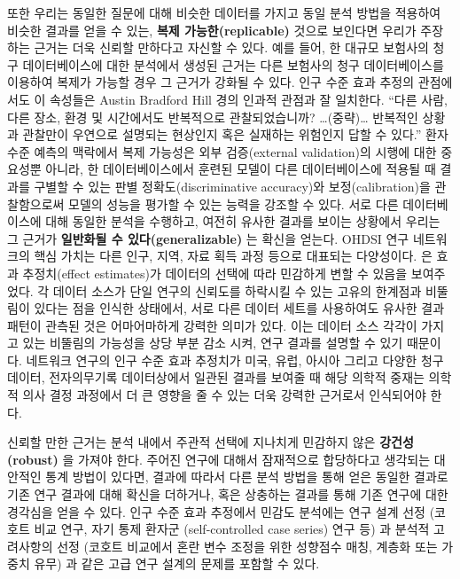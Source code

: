 \documentclass[10.5pt]{book}
\theoremstyle{definition}
\theoremstyle{definition}
\theoremstyle{definition}
\theoremstyle{remark}
\begin{document}
또한 우리는 동일한 질문에 대해 비슷한 데이터를 가지고 동일 분석 방법을
적용하여 비슷한 결과를 얻을 수 있는, \textbf{복제 가능한(replicable)}
것으로 보인다면 우리가 주장하는 근거는 더욱 신뢰할 만하다고 자신할 수
있다. 예를 들어, 한 대규모 보험사의 청구 데이터베이스에 대한 분석에서
생성된 근거는 다른 보험사의 청구 데이터베이스를 이용하여 복제가 가능할
경우 그 근거가 강화될 수 있다. 인구 수준 효과 추정의 관점에서도 이
속성들은 Austin Bradford Hill 경의 인과적 관점과 잘 일치한다. ``다른
사람, 다른 장소, 환경 및 시간에서도 반복적으로 관찰되었습니까?
\ldots{}(중략)\ldots{} 반복적인 상황과 관찰만이 우연으로 설명되는
현상인지 혹은 실재하는 위험인지 답할 수 있다.'' \citep{hill_1965} 환자
수준 예측의 맥락에서 복제 가능성은 외부 검증(external validation)의
시행에 대한 중요성뿐 아니라, 한 데이터베이스에서 훈련된 모델이 다른
데이터베이스에 적용될 때 결과를 구별할 수 있는 판별
정확도(discriminative accuracy)와 보정(calibration)을 관찰함으로써
모델의 성능을 평가할 수 있는 능력을 강조할 수 있다. 서로 다른
데이터베이스에 대해 동일한 분석을 수행하고, 여전히 유사한 결과를 보이는
상황에서 우리는 그 근거가 \textbf{일반화될 수 있다(generalizable)} 는
확신을 얻는다. OHDSI 연구 네트워크의 핵심 가치는 다른 인구, 지역, 자료
획득 과정 등으로 대표되는 다양성이다. \citet{madigan_2013} 은 효과
추정치(effect estimates)가 데이터의 선택에 따라 민감하게 변할 수 있음을
보여주었다. 각 데이터 소스가 단일 연구의 신뢰도를 하락시킬 수 있는
고유의 한계점과 비뚤림이 있다는 점을 인식한 상태에서, 서로 다른 데이터
세트를 사용하여도 유사한 결과 패턴이 관측된 것은 어마어마하게 강력한
의미가 있다. 이는 데이터 소스 각각이 가지고 있는 비뚤림의 가능성을 상당
부분 감소 시켜, 연구 결과를 설명할 수 있기 때문이다. 네트워크 연구의
인구 수준 효과 추정치가 미국, 유럽, 아시아 그리고 다양한 청구데이터,
전자의무기록 데이터상에서 일관된 결과를 보여줄 때 해당 의학적 중재는
의학적 의사 결정 과정에서 더 큰 영향을 줄 수 있는 더욱 강력한 근거로서
인식되어야 한다.

신뢰할 만한 근거는 분석 내에서 주관적 선택에 지나치게 민감하지 않은
\textbf{강건성(robust)} 을 가져야 한다. 주어진 연구에 대해서 잠재적으로
합당하다고 생각되는 대안적인 통계 방법이 있다면, 결과에 따라서 다른 분석
방법을 통해 얻은 동일한 결과로 기존 연구 결과에 대해 확신을 더하거나,
혹은 상충하는 결과를 통해 기존 연구에 대한 경각심을 얻을 수 있다.
\citep{madigan2013design} 인구 수준 효과 추정에서 민감도 분석에는 연구
설계 선정 (코호트 비교 연구, 자기 통제 환자군 (self-controlled case
series) 연구 등) 과 분석적 고려사항의 선정 (코호트 비교에서 혼란 변수
조정을 위한 성향점수 매칭, 계층화 또는 가중치 유무) 과 같은 고급 연구
설계의 문제를 포함할 수 있다.
\end{document}
